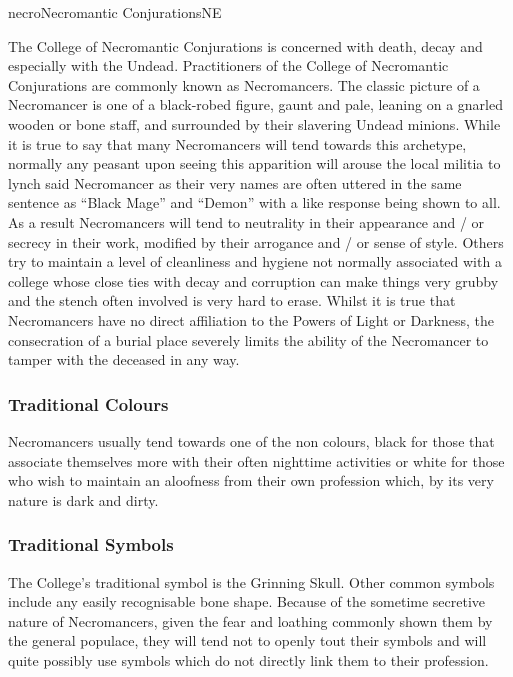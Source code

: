 \begin{college}[1.1]{necro}{Necromantic Conjurations}{NE}

The College of Necromantic Conjurations is concerned with death, decay
and especially with the Undead.  Practitioners of the College of
Necromantic Conjurations are commonly known as Necromancers.  The
classic picture of a Necromancer is one of a black-robed figure, gaunt
and pale, leaning on a gnarled wooden or bone staff, and surrounded by
their slavering Undead minions.  While it is true to say that many
Necromancers will tend towards this archetype, normally any peasant
upon seeing this apparition will arouse the local militia to lynch
said Necromancer as their very names are often uttered in the same
sentence as ``Black Mage'' and ``Demon'' with a like response being
shown to all.  As a result Necromancers will tend to neutrality in
their appearance and / or secrecy in their work, modified by their
arrogance and / or sense of style.  Others try to maintain a level of
cleanliness and hygiene not normally associated with a college whose
close ties with decay and corruption can make things very grubby and
the stench often involved is very hard to erase.  Whilst it is true
that Necromancers have no direct affiliation to the Powers of Light or
Darkness, the consecration of a burial place severely limits the
ability of the Necromancer to tamper with the deceased in any way.

\subsubsection{Traditional Colours}

Necromancers usually tend towards one of the non colours, black for
those that associate themselves more with their often nighttime
activities or white for those who wish to maintain an aloofness from
their own profession which, by its very nature is dark and dirty.

\subsubsection{Traditional Symbols}

The College's traditional symbol is the Grinning Skull.  Other common
symbols include any easily recognisable bone shape.  Because of the
sometime secretive nature of Necromancers, given the fear and loathing
commonly shown them by the general populace, they will tend not to
openly tout their symbols and will quite possibly use symbols which do
not directly link them to their profession.



\end{college}
